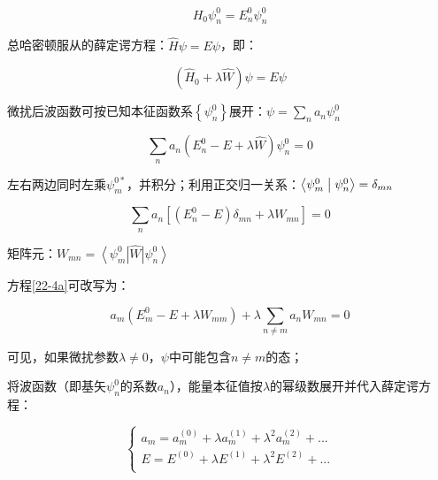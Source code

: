 

\begin{equation}\label{22-2}
H_0 \psi _n^0  = E_n^0 \psi _n^0
\end{equation}


总哈密顿服从的薛定谔方程：$\widehat H\psi  = E\psi $，即：

\begin{equation}\label{22-3}
\left( {\widehat H_0  + \lambda \widehat W} \right)\psi  = E\psi
\end{equation}

微扰后波函数可按已知本征函数系$\left\{ {\psi _n^0 } \right\}$展开：$\psi  = \sum\limits_n {a_n \psi _n^0 } $


\begin{equation}\label{22-4}
\sum\limits_n {a_n \left( {E_n^0  - E + \lambda \widehat W} \right)\psi _n^0 }  = 0
\end{equation}

左右两边同时左乘$\psi _m^{0*} $，并积分；利用正交归一关系：$\left\langle {{\psi _m^0 }}
 \mathrel{\left | {\vphantom {{\psi _m^0 } {\psi _n^0 }}}
 \right. \kern-\nulldelimiterspace}
 {{\psi _n^0 }} \right\rangle  = \delta _{mn} $


\begin{equation}\label{22-4a}
\sum\limits_n {a_n \left[ {\left( {E_n^0  - E} \right)\delta _{mn}  + \lambda W_{mn} } \right] = 0}
\end{equation}

矩阵元：$W_{mn}  = \left\langle {\psi _m^0 } \right|\widehat W\left| {\psi _n^0 } \right\rangle $

方程\ref{22-4a}可改写为：

\begin{equation}\label{22-5}
a_m \left( {E_m^0  - E + \lambda W_{mm} } \right) + \lambda \sum\limits_{n \ne m} {a_n W_{mn} }  = 0
\end{equation}

可见，如果微扰参数$\lambda  \ne 0$，$\psi$中可能包含$n \ne m$的态；

将波函数（即基矢$\psi _n^0 $的系数$a_n$），能量本征值按$\lambda$的幂级数展开并代入薛定谔方程：


\begin{equation}\label{22-6}
\left\{ \begin{array}{l}
 a_m  = a_m^{(0)}  + \lambda a_m^{(1)}  + \lambda ^2 a_m^{(2)}  + ... \\
 E = E^{(0)}  + \lambda E^{(1)}  + \lambda ^2 E^{(2)}  + ... \\
 \end{array} \right.
\end{equation}

